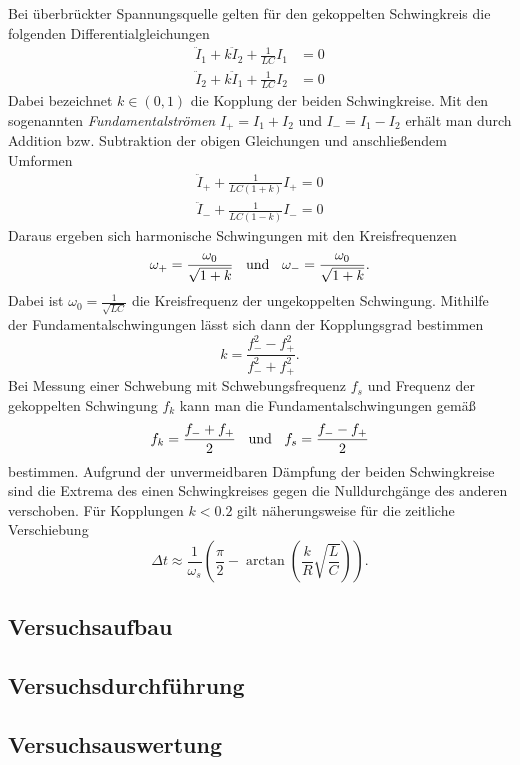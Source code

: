 \documentclass[a4paper, 12pt]{scrartcl}
\begin{document}
Bei überbrückter Spannungsquelle gelten für den gekoppelten Schwingkreis die folgenden Differentialgleichungen 
\begin{align*}
\ddot I_1 + k \ddot I_2 + \frac{1}{LC}I_1 &= 0 \\
\ddot I_2 + k \ddot I_1 + \frac{1}{LC}I_2 &= 0
\end{align*}
Dabei bezeichnet $k \in (0,1)$ die Kopplung der beiden Schwingkreise. 
Mit den sogenannten \textit{Fundamentalströmen} $I_+ = I_1 + I_2$ und $I_- = I_1 - I_2$ erhält man durch Addition bzw. Subtraktion der obigen Gleichungen und anschließendem Umformen
\begin{align*}
\ddot I_+ + \frac{1}{LC(1+k)} I_+ = 0 \\
\ddot I_- + \frac{1}{LC(1-k)} I_- = 0
\end{align*}
Daraus ergeben sich harmonische Schwingungen mit den Kreisfrequenzen 
$$\omega_+ = \frac{\omega_0}{\sqrt{1+k}} \hspace{0.2cm} \text{ und } \hspace{0.2cm} \omega_- = \frac{\omega_0}{\sqrt{1+k}}.$$
Dabei ist $\omega_0 = \frac{1}{\sqrt{LC}}$ die Kreisfrequenz der ungekoppelten Schwingung. Mithilfe der Fundamentalschwingungen lässt sich dann der Kopplungsgrad bestimmen
$$k = \frac{f_-^2 - f_+^2}{f_-^2 + f_+^2}.$$
Bei Messung einer Schwebung mit Schwebungsfrequenz $f_s$ und Frequenz der gekoppelten Schwingung $f_k$ kann man die Fundamentalschwingungen gemäß
$$f_k = \frac{f_- + f_+}{2} \hspace{0.2cm} \text{ und } \hspace{0.2cm} f_s = \frac{f_- - f_+}{2}$$
bestimmen. Aufgrund der unvermeidbaren Dämpfung der beiden Schwingkreise sind die Extrema des einen Schwingkreises gegen die Nulldurchgänge des anderen verschoben. Für Kopplungen $k < 0.2$ gilt näherungsweise für die zeitliche Verschiebung
$$\Delta t \approx \frac{1}{\omega_s} \left( \frac{\pi}{2} - \arctan\left(  \frac kR \sqrt{\frac LC}\right) \right).$$


\subsection{Versuchsaufbau}

\subsection{Versuchsdurchführung}

\subsection{Versuchsauswertung}
\end{document}
